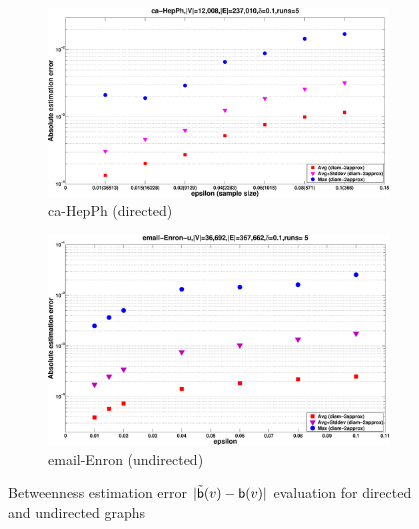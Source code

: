 \begin{figure}[ht]
  \begin{subfigure}[b]{0.45\textwidth}
    \includegraphics[width=0.99\textwidth,keepaspectratio]{figures/eps/ca-HepPh-error}
    \caption{ca-HepPh (directed)}
    \label{fig:HepPh:error}
  \end{subfigure}
  \fi
  \hfill
  \begin{subfigure}[b]{0.45\textwidth}
    \includegraphics[width=0.99\textwidth,keepaspectratio]{figures/eps/email-Enron-error}
    \caption{email-Enron (undirected)}
    \label{fig:email:error}
  \end{subfigure}
  \caption{Betweenness estimation error $|\tilde{\mathsf{b}}(v)-\mathsf{b}(v)|$ evaluation
  for directed and undirected graphs} 
  \label{fig:error}
\end{figure}

